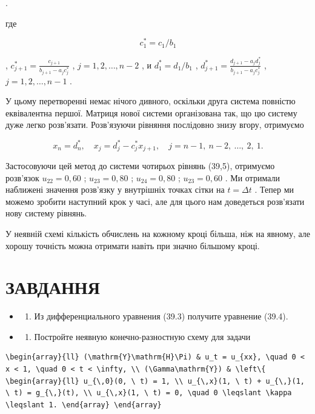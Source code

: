 \documentclass[
  ukrainian,
]{article}
\providecommand{\tightlist}{%
  \setlength{\itemsep}{0pt}\setlength{\parskip}{0pt}}
\begin{document}
.

где

\[
c_1^* = c_1/b_1
\]

, \(c_{j+1}^* = \frac{c_{j+1}}{b_{j+1} - a_j c_j^*}\) ,
\(j = 1, 2, \ldots, n-2\) , и \(d_1^* = d_1/b_1\) ,
\(d_{j+1}^* = \frac{d_{j+1} - a_j d_j^*}{b_{j+1} - a_j c_j^*}\) ,
\(j = 1, 2, \ldots, n-1\) .

У цьому перетворенні немає нічого дивного, оскільки друга система
повністю еквівалентна першої. Матриця нової системи організована так, що
цю систему дуже легко розв'язати. Розв'язуючи рівняння послідовно знизу
вгору, отримуємо

\[
x_n = d_n^*, \quad x_j = d_j^* - c_j^* x_{j+1}, \quad j = n-1, \ n-2, \ \dots, \ 2, \ 1.
\]

Застосовуючи цей метод до системи чотирьох рівнянь (39,5), отримуємо
розв'язок \(u_{22}=0,60\) ; \(u_{23}=0,80\) ; \(u_{24}=0,80\) ;
\(u_{23}=0,60\) . Ми отримали наближені значення розв'язку у внутрішніх
точках сітки на \(t=\Delta t\) . Тепер ми можемо зробити наступний крок
у часі, але для цього нам доведеться розв'язати нову систему рівнянь.

У неявній схемі кількість обчислень на кожному кроці більша, ніж на
явному, але хорошу точність можна отримати навіть при значно більшому
кроці.

\section{ЗАВДАННЯ}\label{ux437ux430ux432ux434ux430ux43dux43dux44f-15}

\begin{itemize}
\tightlist
\item
  \begin{enumerate}
  \def\labelenumi{\arabic{enumi}.}
  \tightlist
  \item
    Из дифференциального уравнения (39.3) получите уравнение (39.4).
  \end{enumerate}
\item
  \begin{enumerate}
  \def\labelenumi{\arabic{enumi}.}
  \setcounter{enumi}{1}
  \tightlist
  \item
    Постройте неявную конечно-разностную схему для задачи
  \end{enumerate}
\end{itemize}

\begin{verbatim}
\begin{array}{ll} (\mathrm{Y}\mathrm{H}\Pi) & u_t = u_{xx}, \quad 0 < x < 1, \quad 0 < t < \infty, \\ (\Gamma\mathrm{Y}) & \left\{ \begin{array}{ll} u_{\,0}(0, \ t) = 1, \\ u_{\,x}(1, \ t) + u_{\,}(1, \ t) = g_{\,}(t), \\ u_{\,x}(1, \ t) = 0, \quad 0 \leqslant \kappa \leqslant 1. \end{array} \end{array}
\end{verbatim}
\end{document}
